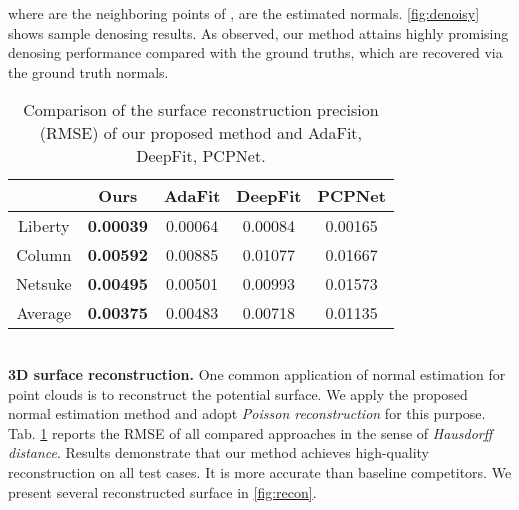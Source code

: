 \documentclass[runningheads]{llncs}
\begin{document}
where  are the neighboring points of ,  are the estimated normals. \cref{fig:denoisy} shows sample denosing results. As observed, our method attains highly promising denosing performance compared with the ground truths, which are recovered via the ground truth normals.
\begin{table}[t]
	\centering
	\caption{Comparison of the 
		surface reconstruction precision (RMSE) of our proposed method and AdaFit, DeepFit, PCPNet.}
	\begin{tabular}{@{}ccccc@{}}
		\toprule
		& Ours             & AdaFit  & DeepFit & PCPNet  \\ \midrule
		Liberty & \textbf{0.00039} & 0.00064 & 0.00084 & 0.00165 \\
		Column  & \textbf{0.00592} & 0.00885 & 0.01077 & 0.01667 \\
		Netsuke & \textbf{0.00495} & 0.00501 & 0.00993 & 0.01573 \\
		Average & \textbf{0.00375} & 0.00483 & 0.00718 & 0.01135 \\ \bottomrule
	\end{tabular}
	\label{tab:recon}
\end{table}
\\
\noindent\textbf{3D surface reconstruction.} One common application of normal estimation for point clouds is to reconstruct the potential surface. We apply the proposed normal estimation method and adopt \emph{Poisson reconstruction} \cite{kazhdan2006poisson} for this purpose. Tab. \ref{tab:recon} reports the RMSE of all compared approaches in the sense of \emph{Hausdorff distance}. Results demonstrate that our method achieves high-quality reconstruction on all test cases. It is more accurate than baseline competitors. We present several reconstructed surface in \cref{fig:recon}.
\end{document}
